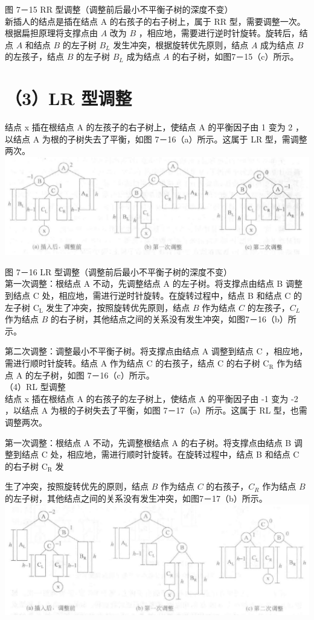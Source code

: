 \documentclass[10pt]{article}
\begin{document}
图 7－15 RR 型调整（调整前后最小不平衡子树的深度不变）\\
新插人的结点是插在结点 A 的右孩子的右子树上，属于 RR 型，需要调整一次。根据扁担原理将支撑点由 $A$ 改为 $B$ ，相应地，需要进行逆时针旋转。旋转后，结点 $A$ 和结点 $B$ 的左子树 $B_{L}$ 发生冲突，根据旋转优先原则，结点 $A$ 成为结点 $B$ 的左孩子，结点 $B$ 的左子树 $B_{L}$ 成为结点 $A$ 的右子树，如图7－15（c）所示。

\section*{（3）LR 型调整}
结点 x 插在根结点 A 的左孩子的右子树上，使结点 A 的平衡因子由 1 变为 2 ，以结点 A 为根的子树失去了平衡，如图 7－16（a）所示。这属于 LR 型，需调整两次。\\
\includegraphics[max width=\textwidth, center]{2025_06_06_704745ea57b15b2333e5g-246(1)}

图 7－16 LR 型调整（调整前后最小不平衡子树的深度不变）\\
第一次调整：根结点 A 不动，先调整结点 A 的左子树。将支撑点由结点 B 调整到结点 C 处，相应地，需进行逆时针旋转。在旋转过程中，结点 B 和结点 C 的左子树 $\mathrm{C}_{\mathrm{L}}$ 发生了冲突，按照旋转优先原则，结点 $B$ 作为结点 $C$ 的左孩子，$C_{L}$ 作为结点 $B$ 的右子树，其他结点之间的关系没有发生冲突，如图7－16（b）所示。

第二次调整：调整最小不平衡子树。将支撑点由结点 A 调整到结点 C ，相应地，需进行顺时针旋转。结点 A 作为结点 C 的右孩子，结点 C 的右子树 $\mathrm{C}_{\mathrm{R}}$ 作为结点 A 的左子树，如图 7－16（c）所示。\\
（4）RL 型调整\\
结点 x 插在根结点 A 的右孩子的左子树上，使结点 A 的平衡因子由 -1 变为 -2 ，以结点 A 为根的子树失去了平衡，如图 7－17（a）所示。这属于 RL 型，也需调整两次。

第一次调整：根结点 A 不动，先调整根结点 A 的右子树。将支撑点由结点 B 调整到结点 C 处，相应地，需进行顺时针旋转。在旋转过程中，结点 B 和结点 C 的右子树 $\mathrm{C}_{\mathrm{R}}$ 发

生了冲突，按照旋转优先的原则，结点 $B$ 作为结点 $C$ 的右孩子，$C_{R}$ 作为结点 $B$ 的左子树，其他结点之间的关系没有发生冲突，如图7－17（b）所示。\\
\includegraphics[max width=\textwidth, center]{2025_06_06_704745ea57b15b2333e5g-247(1)}
\end{document}
